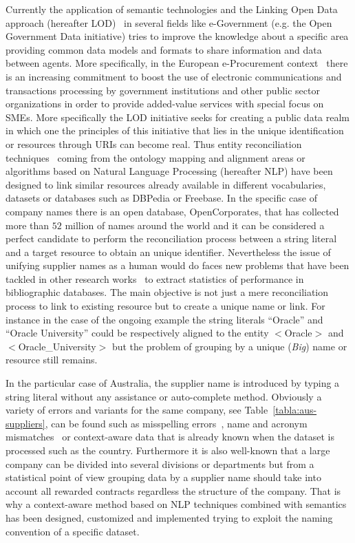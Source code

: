 \documentclass{llncs}
\begin{document}
Currently the application of semantic technologies and the Linking Open Data approach (hereafter LOD)~\cite{Berners-Lee-2006,Heath_Bizer_2011}  
in several fields like e-Government (e.g. the Open Government Data initiative) tries to improve the knowledge about a specific area providing 
common data models and formats to share information and data between agents. More specifically, in the European e-Procurement 
context~\cite{e-Proc-map-paper} there is an increasing commitment to boost the use of electronic communications and transactions 
processing by government institutions and other public sector organizations in order to provide added-value services with special focus on SMEs. 
More specifically the LOD initiative seeks for creating a public data realm in which one the principles of this initiative that lies in the 
unique identification or resources through URIs can become real. Thus entity reconciliation techniques~\cite{Serimi,conf/www/MaaliCP11} 
coming from the ontology mapping and alignment areas or algorithms based on Natural Language Processing (hereafter NLP) have been 
designed to link similar resources already available in different vocabularies, datasets or databases such as DBPedia or Freebase. 
In the specific case of company names there is an open database, OpenCorporates, that has collected more than $52$ million of names 
around the world and it can be considered a perfect candidate to perform the reconciliation process between a string literal and a 
target resource to obtain an unique identifier. Nevertheless the issue of unifying supplier names as a human would do 
faces new  problems that have been tackled in other research works~\cite{Galvez2006} to extract statistics of performance in bibliographic databases. 
The main objective is not just a mere reconciliation process to link to existing resource but to create a unique name or link. For instance in the case 
of the ongoing example the string literals ``Oracle'' and ``Oracle University'' could be respectively aligned 
to the entity $<$Oracle$>$ and $<$Oracle\_University$>$ but the problem of grouping by a unique (\textit{Big}) name 
or resource still remains. 

In the particular case of Australia, the supplier name is introduced by typing a string literal without any assistance or 
auto-complete method. Obviously a variety of errors and variants for the same company, see Table~\ref{tabla:aus-suppliers}, 
can be found such as misspelling errors~\cite{NorvigSpelling,StanfordSpelling}, name and 
acronym mismatches~\cite{Yeates99automaticextraction,Ratinov:2004:AES:1025132.1026366} or context-aware data that is 
already known when the dataset is processed such as the country. Furthermore it is also well-known that a large company can 
be divided into several divisions or departments but from a statistical point of view grouping data by a supplier name 
should take into account all rewarded contracts regardless the structure of the company. That is why a context-aware 
method based on NLP techniques combined with semantics has been designed, customized and implemented trying 
to exploit the naming convention of a specific dataset.
\end{document}
